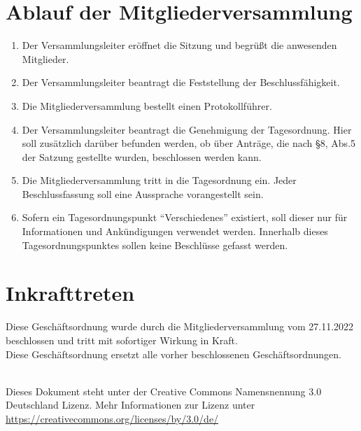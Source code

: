 \documentclass[a4paper, 12pt]{scrartcl}
\begin{document}
\section{Ablauf der Mitgliederversammlung}
\begin{enumerate} 
	\item Der Versammlungsleiter eröffnet die Sitzung und begrüßt die anwesenden Mitglieder.
	\item Der Versammlungsleiter beantragt die Feststellung der Beschlussfähigkeit.
	\item Die Mitgliederversammlung bestellt einen Protokollführer.
	\item Der Versammlungsleiter beantragt die Genehmigung der Tagesordnung. Hier soll zusätzlich darüber befunden werden, ob über Anträge, die nach §8, Abs.5 der Satzung gestellte wurden, beschlossen werden kann.
	\item Die Mitgliederversammlung tritt in die Tagesordnung ein. Jeder Beschlussfassung soll eine Aussprache vorangestellt sein.
	\item Sofern ein Tagesordnungspunkt "`Verschiedenes"' existiert, soll dieser nur für Informationen und Ankündigungen verwendet werden. Innerhalb dieses Tagesordnungspunktes sollen keine Beschlüsse gefasst werden.
\end{enumerate}

\section{Inkrafttreten}
Diese Geschäftsordnung wurde durch die 
Mitgliederversammlung 
vom 27.11.2022 beschlossen und tritt mit sofortiger Wirkung in Kraft.\\
Diese Geschäftsordnung ersetzt alle vorher beschlossenen Geschäftsordnungen.

\vfill

\begin{flushright}
	\ccby \\
	{\small
		Dieses Dokument steht unter der Creative Commons Namensnennung 3.0 Deutschland Lizenz. Mehr Informationen zur Lizenz unter \url{https://creativecommons.org/licenses/by/3.0/de/}
	}
\end{flushright}
\end{document}
